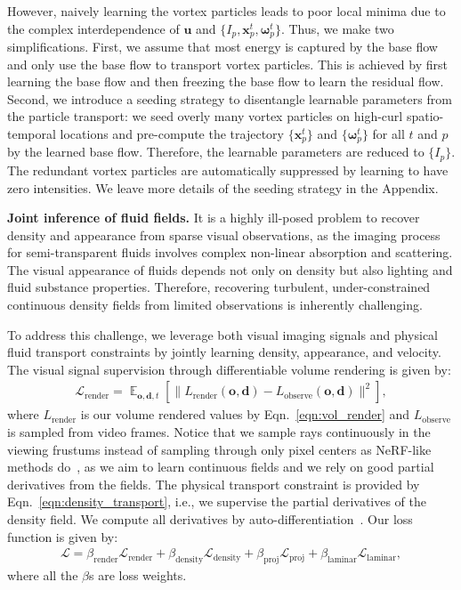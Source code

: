 \documentclass{article}
\newcommand{\eqn}[1]{Eqn.~\ref{#1}}
\newcommand{\myparagraph}[1]{\vspace{0.1cm}\noindent\textbf{#1}}
\begin{document}
However, naively learning the vortex particles leads to poor local minima due to the complex interdependence of $\mathbf{u}$ and $\{I_p, \mathbf{x}^t_p, \boldsymbol{\omega}^t_p\}$. Thus, we make two simplifications. First, we assume that most energy is captured by the base flow and only use the base flow to transport vortex particles. This is achieved by first learning the base flow and then freezing the base flow to learn the residual flow. Second, we introduce a seeding strategy to disentangle learnable parameters from the particle transport: we seed overly many vortex particles on high-curl spatio-temporal locations and pre-compute the trajectory $\{\mathbf{x}^t_p\}$ and $\{\boldsymbol{\omega}^t_p\}$ for all $t$ and $p$ by the learned base flow. Therefore, the learnable parameters are reduced to $\{I_p\}$. The redundant vortex particles are automatically suppressed by learning to have zero intensities. We leave more details of the seeding strategy in the Appendix.

\myparagraph{Joint inference of fluid fields.}
It is a highly ill-posed problem to recover density and appearance from sparse visual observations, as the imaging process for semi-transparent fluids involves complex non-linear absorption and scattering. The visual appearance of fluids depends not only on density but also lighting and fluid substance properties. Therefore, recovering turbulent, under-constrained continuous density fields from limited observations is inherently challenging. 

To address this challenge, we leverage both visual imaging signals and physical fluid transport constraints by jointly learning density, appearance, and velocity. The visual signal supervision through differentiable volume rendering is given by:
\begin{align}\label{eqn:rendering_loss}
    \mathcal{L}_\text{render} = \mathop{\mathbb{E}}_{\mathbf{o}, \mathbf{d}, t}\left[\lVert L_\text{render}(\mathbf{o}, \mathbf{d})- L_\text{observe}(\mathbf{o}, \mathbf{d})\rVert^2\right],
\end{align}
where $L_\text{render}$ is our volume rendered values by \eqn{eqn:vol_render} and $L_\text{observe}$ is sampled from video frames.
Notice that we sample rays continuously in the viewing frustums instead of sampling through only pixel centers as NeRF-like methods do~\citep{mildenhall2020nerf}, as we aim to learn continuous fields and we rely on good partial derivatives from the fields. The physical transport constraint is provided by \eqn{eqn:density_transport}, i.e., we supervise the partial derivatives of the density field. We compute all derivatives by auto-differentiation~\citep{paszke2017automatic}. Our loss function is given by:
\begin{align}\label{eqn:final_loss}
    \mathcal{L} = \beta_\text{render}\mathcal{L}_\text{render} + \beta_\text{density}\mathcal{L}_\text{density} + \beta_\text{proj}\mathcal{L}_\text{proj} + \beta_\text{laminar}\mathcal{L}_\text{laminar},
\end{align}
where all the $\beta$s are loss weights.
\end{document}

